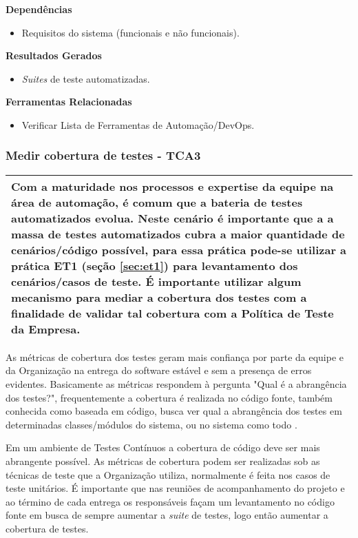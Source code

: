 \textbf{Dependências}
\begin{itemize}
    \item Requisitos do sistema (funcionais e não funcionais).
\end{itemize}

\textbf{Resultados Gerados}
\begin{itemize}
    \item \textit{Suites} de teste automatizadas.

\end{itemize}

\textbf{Ferramentas Relacionadas}
\begin{itemize}
    \item Verificar Lista de Ferramentas de Automação/DevOps.
\end{itemize}


\subsubsection{Medir cobertura de testes - TCA3}
\label{sec:tca3}

\begin{table}[H]
\centering
\begin{tabular}{|p{130mm}|}
\hline
Com a maturidade nos processos e expertise da equipe na área de automação, é comum que a bateria de testes automatizados evolua. Neste cenário é importante que a a massa de testes automatizados cubra a maior quantidade de cenários/código possível, para essa prática pode-se utilizar a prática ET1 (seção \ref{sec:et1}) para levantamento dos cenários/casos de teste.
É importante utilizar algum mecanismo para mediar a cobertura dos testes com a finalidade de validar tal cobertura com a Política de Teste da Empresa.\\ 
\hline
\end{tabular}
\end{table}

As métricas de cobertura dos testes geram mais confiança por parte da equipe e da Organização na entrega do software estável e sem a presença de erros evidentes. Basicamente as métricas respondem à pergunta "Qual é a abrangência dos testes?", frequentemente a cobertura é realizada no código fonte, também conhecida como baseada em código, busca ver qual a abrangência dos testes em determinadas classes/módulos do sistema, ou no sistema como todo \cite{RUP940320}.

Em um ambiente de Testes Contínuos a cobertura de código deve ser mais abrangente possível. As métricas de cobertura podem ser realizadas sob as técnicas de teste que a Organização utiliza, normalmente é feita nos casos de teste unitários. É importante que nas reuniões de acompanhamento do projeto e ao término de cada entrega os responsáveis façam um levantamento no código fonte em busca de sempre aumentar a \textit{suite} de testes, logo então aumentar a cobertura de testes.


